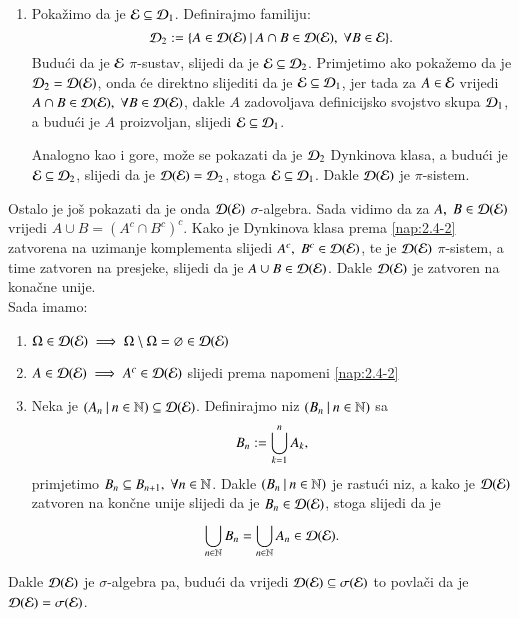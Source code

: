 \begin{rj}[\ref{zad:2.5}]
\begin{enumerate}[label=(\arabic*)]
        \item   \label{rj:2.5b}
        Poka\v zimo da je $\mathcal{E} \subseteq \mathcal{D}_1$.
        Definirajmo familiju:
        \begin{equation*}
            \mathcal{D}_2 := \{{A \in \mathcal{D}({\mathcal{E}})} \: | \: {A \cap B \in \mathcal{D}({\mathcal{E}}), \; \forall B \in \mathcal{E}}\}.
        \end{equation*}
        Budu\' ci da je $\mathcal{E}$ $\pi$-sustav, slijedi da je $\mathcal{E} \subseteq \mathcal{D}_2$. Primjetimo ako poka\v zemo da je $\mathcal{D}_2 = \mathcal{D}({\mathcal{E}})$, onda \' ce direktno slijediti da je $\mathcal{E} \subseteq \mathcal{D}_1$, jer tada za $A \in \mathcal{E}$ vrijedi $A \cap B \in \mathcal{D}({\mathcal{E}}), \; \forall B \in \mathcal{D}({\mathcal{E}})$, dakle $A$ zadovoljava definicijsko svojstvo skupa $\mathcal{D}_1$, a budu\' ci je $A$ proizvoljan, slijedi $\mathcal{E} \subseteq \mathcal{D}_1$.

        Analogno kao i gore, mo\v ze se pokazati da je $\mathcal{D}_2$ Dynkinova klasa, a budu\' ci je $\mathcal{E} \subseteq \mathcal{D}_2$, slijedi da je $\mathcal{D}({\mathcal{E}}) = \mathcal{D}_2$, stoga $\mathcal{E} \subseteq \mathcal{D}_1$. Dakle $\mathcal{D}({\mathcal{E}})$ je $\pi$-sistem.
    \end{enumerate}

    Ostalo je jo\v s pokazati da je onda $\mathcal{D}({\mathcal{E}})$ $\sigma$-algebra.
    Sada vidimo da za $A, \; B \in \mathcal{D}({\mathcal{E}})$ vrijedi $A \cup B = (A^c \cap B^c)^c$. Kako je Dynkinova klasa prema \ref{nap:2.4-2} zatvorena na uzimanje komplementa slijedi $A^c, \; B^c \in \mathcal{D}({\mathcal{E}})$, te je $\mathcal{D}({\mathcal{E}})$ $\pi$-sistem, a time zatvoren na presjeke, slijedi da je $A \cup B \in \mathcal{D}({\mathcal{E}})$. Dakle $\mathcal{D}({\mathcal{E}})$ je zatvoren na kona\v cne unije.\\
    Sada imamo:
    \begin{enumerate}[label=(\roman*)]
        \item $\Omega \in \mathcal{D}({\mathcal{E}}) \implies \Omega \setminus \Omega = \varnothing \in \mathcal{D}({\mathcal{E}})$
        \item $A \in \mathcal{D}({\mathcal{E}}) \implies A^c \in \mathcal{D}({\mathcal{E}})$ slijedi prema napomeni \ref{nap:2.4-2}
        \item Neka je $({A_n} \: | \: {n \in \mathbb{N}}) \subseteq \mathcal{D}({\mathcal{E}})$.
        Definirajmo niz $({B_n} \: | \: {n \in \mathbb{N}})$ sa
        \begin{equation*}
            B_n := \bigcup\limits_{k = 1}^{n} A_k,    
        \end{equation*}
        primjetimo $B_n \subseteq B_{n + 1}, \; \forall n \in \mathbb{N}$. Dakle $({B_n} \: | \: {n \in \mathbb{N}})$ je rastu\' ci niz, a kako je $\mathcal{D}({\mathcal{E}})$ zatvoren na kon\v cne unije slijedi da je $B_n \in \mathcal{D}({\mathcal{E}})$, stoga slijedi da je
        \begin{equation*}
            \bigcup\limits_{n \in \mathbb{N}}^{} B_n = \bigcup\limits_{n \in \mathbb{N}}^{} A_n \in \mathcal{D}({\mathcal{E}}).
        \end{equation*}
    \end{enumerate}
    Dakle $\mathcal{D}({\mathcal{E}})$ je $\sigma$-algebra pa, budu\' ci da vrijedi $\mathcal{D}({\mathcal{E}}) \subseteq \sigma({\mathcal{E}})$ to povla\v ci da je $\mathcal{D}({\mathcal{E}}) = \sigma({\mathcal{E}})$.
\end{rj}

